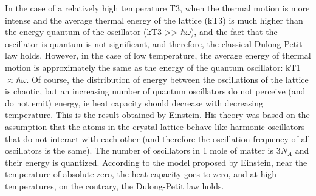 \documentclass[a4paper,14pt]{extreport}
\begin{document}
In the case of a relatively high temperature T3, when the thermal motion is more intense and the average thermal energy of the lattice (kT3) is much higher than the energy quantum of the oscillator (kT3 >> $ \hbar \omega $), and the fact that the oscillator is quantum is not significant, and therefore, the classical Dulong-Petit law holds.
However, in the case of low temperature, the average energy of thermal motion is approximately the same as the energy of the quantum oscillator: kT1 $ \approx \hbar \omega $. Of course, the distribution of energy between the oscillations of the lattice is chaotic, but an increasing number of quantum oscillators do not perceive (and do not emit) energy, ie heat capacity should decrease with decreasing temperature.
  This is the result obtained by Einstein. His theory was based on the assumption that the atoms in the crystal lattice behave like harmonic oscillators that do not interact with each other (and therefore the oscillation frequency of all oscillators is the same). The number of oscillators in 1 mole of matter is $ 3N_A $ and their energy is quantized. According to the model proposed by Einstein, near the temperature of absolute zero, the heat capacity goes to zero, and at high temperatures, on the contrary, the Dulong-Petit law holds.
  
\end{document}
